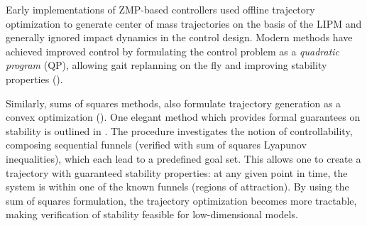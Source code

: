 Early implementations of ZMP-based controllers used offline trajectory optimization to generate center of mass trajectories on the basis of the LIPM and generally ignored impact dynamics in the control design. Modern methods have achieved improved control by formulating the control problem as a {\em quadratic program} (QP), allowing gait replanning on the fly and improving stability properties (\cite{KuKoIk02,stephens2010push,herdt2010online}).
%

Similarly, sums of squares methods, also formulate trajectory generation as a convex optimization (\cite{TeMaToRo2010}).
%
One elegant method which provides formal guarantees on stability is outlined in \cite{MaAhTe2013}.
%
The procedure investigates the notion of controllability, composing sequential funnels (verified with sum of squares Lyapunov inequalities), which each lead to a predefined goal set.
%
This allows one to create a trajectory with guaranteed stability properties: at any given point in time, the system is within one of the known funnels (regions of attraction).
%
By using the sum of squares formulation, the trajectory optimization becomes more tractable, making verification of stability feasible for low-dimensional models.









